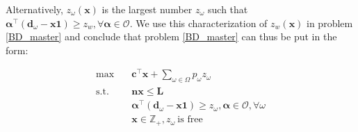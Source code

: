 Alternatively, $z_{\omega}(\mathbf{x})$ is the largest number $z_{\omega}$ such that $\bm{\alpha}^{\intercal}(\mathbf{d}_{\omega}- \mathbf{x} \mathbf{1}) \geq z_w, \forall \bm{\alpha} \in \mathcal{O}$. We use this characterization of $z_w(\mathbf{x})$ in problem \eqref{BD_master} and conclude that problem \eqref{BD_master} can thus be put in the form:

\begin{equation}\label{BD_master2}
  \begin{aligned}
    \max \quad & \mathbf{c}^{\intercal} \mathbf{x} + \sum_{\omega \in \Omega} p_{\omega} z_{\omega} \\
    \text {s.t.} \quad & \mathbf{n} \mathbf{x} \leq \mathbf{L} \\
    & \bm{\alpha}^{\intercal}(\mathbf{d}_{\omega}- \mathbf{x} \mathbf{1}) \geq z_{\omega}, \bm{\alpha} \in \mathcal{O}, \forall \omega \\
     & \mathbf{x} \in \mathbb{Z}_{+}, z_{\omega} ~\text{is free}
  \end{aligned}
\end{equation}








